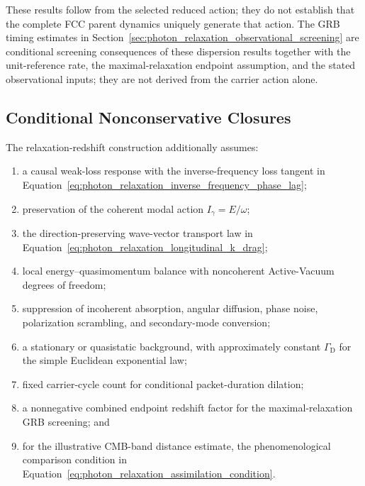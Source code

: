 These results follow from the selected reduced action; they do not establish
that the complete FCC parent dynamics uniquely generate that action. The GRB
timing estimates in
Section~\ref{sec:photon_relaxation_observational_screening} are conditional
screening consequences of these dispersion results together with the
unit-reference rate, the maximal-relaxation endpoint assumption, and the
stated observational inputs; they are not derived from the carrier action
alone.


\subsection{Conditional Nonconservative Closures}
\label{subsec:photon_relaxation_conditional_status}

The relaxation-redshift construction additionally assumes:

\begin{enumerate}
    \item a causal weak-loss response with the inverse-frequency loss tangent
    in
    Equation~\eqref{eq:photon_relaxation_inverse_frequency_phase_lag};

    \item preservation of the coherent modal action
    \(I_{\gamma}=E/\omega\);

    \item the direction-preserving wave-vector transport law in
    Equation~\eqref{eq:photon_relaxation_longitudinal_k_drag};

    \item local energy--quasimomentum balance with noncoherent Active-Vacuum
    degrees of freedom;

    \item suppression of incoherent absorption, angular diffusion, phase
    noise, polarization scrambling, and secondary-mode conversion;

    \item a stationary or quasistatic background, with approximately constant
    \(\Gamma_{\mathrm D}\)
    for the simple Euclidean exponential law;

    \item fixed carrier-cycle count for conditional packet-duration dilation;

    \item a nonnegative combined endpoint redshift factor for the
    maximal-relaxation GRB screening; and

    \item for the illustrative CMB-band distance estimate, the phenomenological
    comparison condition in
    Equation~\eqref{eq:photon_relaxation_assimilation_condition}.
\end{enumerate}

